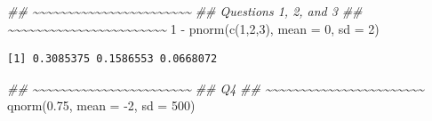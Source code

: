 \documentclass[
  letterpaper,
  DIV=11,
  numbers=noendperiod,
  oneside]{scrreprt}
\newenvironment{Shaded}{\begin{snugshade}}{\end{snugshade}}
\newcommand{\AttributeTok}[1]{\textcolor[rgb]{0.40,0.45,0.13}{#1}}
\newcommand{\DecValTok}[1]{\textcolor[rgb]{0.68,0.00,0.00}{#1}}
\newcommand{\DocumentationTok}[1]{\textcolor[rgb]{0.37,0.37,0.37}{\textit{#1}}}
\newcommand{\FloatTok}[1]{\textcolor[rgb]{0.68,0.00,0.00}{#1}}
\newcommand{\FunctionTok}[1]{\textcolor[rgb]{0.28,0.35,0.67}{#1}}
\newcommand{\NormalTok}[1]{\textcolor[rgb]{0.00,0.23,0.31}{#1}}
\newcommand{\SpecialCharTok}[1]{\textcolor[rgb]{0.37,0.37,0.37}{#1}}
\begin{document}
\begin{Shaded}
\begin{Highlighting}[]
\DocumentationTok{\#\# \textasciitilde{}\textasciitilde{}\textasciitilde{}\textasciitilde{}\textasciitilde{}\textasciitilde{}\textasciitilde{}\textasciitilde{}\textasciitilde{}\textasciitilde{}\textasciitilde{}\textasciitilde{}\textasciitilde{}\textasciitilde{}\textasciitilde{}\textasciitilde{}\textasciitilde{}\textasciitilde{}\textasciitilde{}\textasciitilde{}\textasciitilde{}\textasciitilde{}\textasciitilde{}}
\DocumentationTok{\#\# Questions 1, 2, and 3}
\DocumentationTok{\#\# \textasciitilde{}\textasciitilde{}\textasciitilde{}\textasciitilde{}\textasciitilde{}\textasciitilde{}\textasciitilde{}\textasciitilde{}\textasciitilde{}\textasciitilde{}\textasciitilde{}\textasciitilde{}\textasciitilde{}\textasciitilde{}\textasciitilde{}\textasciitilde{}\textasciitilde{}\textasciitilde{}\textasciitilde{}\textasciitilde{}\textasciitilde{}\textasciitilde{}\textasciitilde{}}
\DecValTok{1} \SpecialCharTok{{-}} \FunctionTok{pnorm}\NormalTok{(}\FunctionTok{c}\NormalTok{(}\DecValTok{1}\NormalTok{,}\DecValTok{2}\NormalTok{,}\DecValTok{3}\NormalTok{), }\AttributeTok{mean =} \DecValTok{0}\NormalTok{, }\AttributeTok{sd =} \DecValTok{2}\NormalTok{)}
\end{Highlighting}
\end{Shaded}

\begin{verbatim}
[1] 0.3085375 0.1586553 0.0668072
\end{verbatim}

\begin{Shaded}
\begin{Highlighting}[]
\DocumentationTok{\#\# \textasciitilde{}\textasciitilde{}\textasciitilde{}\textasciitilde{}\textasciitilde{}\textasciitilde{}\textasciitilde{}\textasciitilde{}\textasciitilde{}\textasciitilde{}\textasciitilde{}\textasciitilde{}\textasciitilde{}\textasciitilde{}\textasciitilde{}\textasciitilde{}\textasciitilde{}\textasciitilde{}\textasciitilde{}\textasciitilde{}\textasciitilde{}\textasciitilde{}\textasciitilde{}}
\DocumentationTok{\#\# Q4}
\DocumentationTok{\#\# \textasciitilde{}\textasciitilde{}\textasciitilde{}\textasciitilde{}\textasciitilde{}\textasciitilde{}\textasciitilde{}\textasciitilde{}\textasciitilde{}\textasciitilde{}\textasciitilde{}\textasciitilde{}\textasciitilde{}\textasciitilde{}\textasciitilde{}\textasciitilde{}\textasciitilde{}\textasciitilde{}\textasciitilde{}\textasciitilde{}\textasciitilde{}\textasciitilde{}\textasciitilde{}}
\FunctionTok{qnorm}\NormalTok{(}\FloatTok{0.75}\NormalTok{, }\AttributeTok{mean =} \SpecialCharTok{{-}}\DecValTok{2}\NormalTok{, }\AttributeTok{sd =} \DecValTok{500}\NormalTok{)}
\end{Highlighting}
\end{Shaded}
\end{document}
